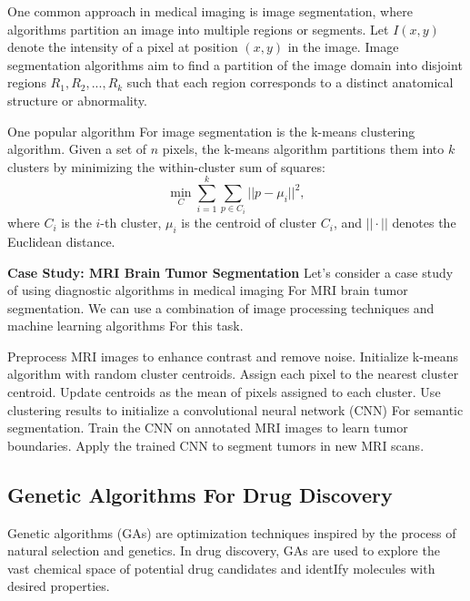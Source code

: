 \documentclass[12pt]{book} %
\begin{document}
One common approach in medical imaging is image segmentation, where algorithms partition an image into multiple regions or segments. Let $I(x,y)$ denote the intensity of a pixel at position $(x,y)$ in the image. Image segmentation algorithms aim to find a partition of the image domain into disjoint regions $R_1, R_2, ..., R_k$ such that each region corresponds to a distinct anatomical structure or abnormality.

One popular algorithm For image segmentation is the k-means clustering algorithm. Given a set of $n$ pixels, the k-means algorithm partitions them into $k$ clusters by minimizing the within-cluster sum of squares:
\begin{equation*}
\min_{C} \sum_{i=1}^{k} \sum_{p \in C_i} ||p - \mu_i||^2,
\end{equation*}
where $C_i$ is the $i$-th cluster, $\mu_i$ is the centroid of cluster $C_i$, and $||\cdot||$ denotes the Euclidean distance.

\textbf{Case Study: MRI Brain Tumor Segmentation}
Let's consider a case study of using diagnostic algorithms in medical imaging For MRI brain tumor segmentation. We can use a combination of image processing techniques and machine learning algorithms For this task.
\FloatBarrier
\begin{algorithm}
\caption{MRI Brain Tumor Segmentation}
\begin{algorithmic}[1]
\State Preprocess MRI images to enhance contrast and remove noise.
\State Initialize k-means algorithm with random cluster centroids.
    \State Assign each pixel to the nearest cluster centroid.
    \State Update centroids as the mean of pixels assigned to each cluster.
\EndWhile
\State Use clustering results to initialize a convolutional neural network (CNN) For semantic segmentation.
\State Train the CNN on annotated MRI images to learn tumor boundaries.
\State Apply the trained CNN to segment tumors in new MRI scans.
\end{algorithmic}
\end{algorithm}
\FloatBarrier
\subsection{Genetic Algorithms For Drug Discovery}
Genetic algorithms (GAs) are optimization techniques inspired by the process of natural selection and genetics. In drug discovery, GAs are used to explore the vast chemical space of potential drug candidates and identIfy molecules with desired properties.
\end{document}

